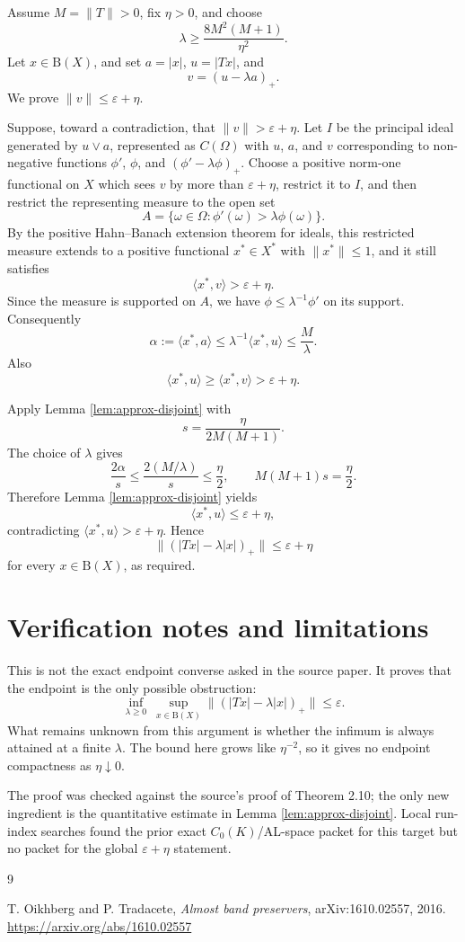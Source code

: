 \documentclass[11pt]{article}
\newcommand{\eps}{\varepsilon}
\newcommand{\etae}{\eta}
\newcommand{\ball}{\mathrm B}
\begin{document}
Assume \(M=\|T\|>0\), fix \(\etae>0\), and choose
\[
 \lambda\ge \frac{8M^2(M+1)}{\etae^2}.
\]
Let \(x\in\ball(X)\), and set \(a=|x|\), \(u=|Tx|\), and
\[
 v=(u-\lambda a)_+.
\]
We prove \(\|v\|\le\eps+\etae\).

Suppose, toward a contradiction, that \(\|v\|>\eps+\etae\). Let \(I\) be the
principal ideal generated by \(u\vee a\), represented as \(C(\Omega)\) with
\(u\), \(a\), and \(v\) corresponding to non-negative functions
\(\phi'\), \(\phi\), and \((\phi'-\lambda\phi)_+\). Choose a positive
norm-one functional on \(X\) which sees \(v\) by more than \(\eps+\etae\),
restrict it to \(I\), and then restrict the representing measure to the open
set
\[
 A=\{\omega\in\Omega:\phi'(\omega)>\lambda\phi(\omega)\}.
\]
By the positive Hahn--Banach extension theorem for ideals, this restricted
measure extends to a positive functional \(x^*\in X^*\) with
\(\|x^*\|\le1\), and it still satisfies
\[
 \langle x^*,v\rangle>\eps+\etae.
\]
Since the measure is supported on \(A\), we have \(\phi\le \lambda^{-1}\phi'\)
on its support. Consequently
\[
 \alpha:=\langle x^*,a\rangle
 \le \lambda^{-1}\langle x^*,u\rangle
 \le \frac{M}{\lambda}.
\]
Also
\[
 \langle x^*,u\rangle\ge \langle x^*,v\rangle>\eps+\etae.
\]

Apply Lemma \ref{lem:approx-disjoint} with
\[
 s=\frac{\etae}{2M(M+1)}.
\]
The choice of \(\lambda\) gives
\[
 \frac{2\alpha}{s}\le \frac{2(M/\lambda)}{s}\le\frac{\etae}{2},
\qquad
 M(M+1)s=\frac{\etae}{2}.
\]
Therefore Lemma \ref{lem:approx-disjoint} yields
\[
 \langle x^*,u\rangle\le \eps+\etae,
\]
contradicting \(\langle x^*,u\rangle>\eps+\etae\). Hence
\[
 \big\|(|Tx|-\lambda |x|)_+\big\|\le\eps+\etae
\]
for every \(x\in\ball(X)\), as required.

\section*{Verification notes and limitations}

This is not the exact endpoint converse asked in the source paper. It proves
that the endpoint is the only possible obstruction:
\[
 \inf_{\lambda\ge0}\ \sup_{x\in\ball(X)}
 \big\|(|Tx|-\lambda |x|)_+\big\|\le \eps.
\]
What remains unknown from this argument is whether the infimum is always
attained at a finite \(\lambda\). The bound here grows like \(\etae^{-2}\),
so it gives no endpoint compactness as \(\etae\downarrow0\).

The proof was checked against the source's proof of Theorem 2.10; the only
new ingredient is the quantitative estimate in Lemma \ref{lem:approx-disjoint}.
Local run-index searches found the prior exact \(C_0(K)\)/AL-space packet for
this target but no packet for the global \(\eps+\etae\) statement.

\begin{thebibliography}{9}

T. Oikhberg and P. Tradacete,
\emph{Almost band preservers},
arXiv:1610.02557, 2016.
\url{https://arxiv.org/abs/1610.02557}

\end{thebibliography}
\end{document}
